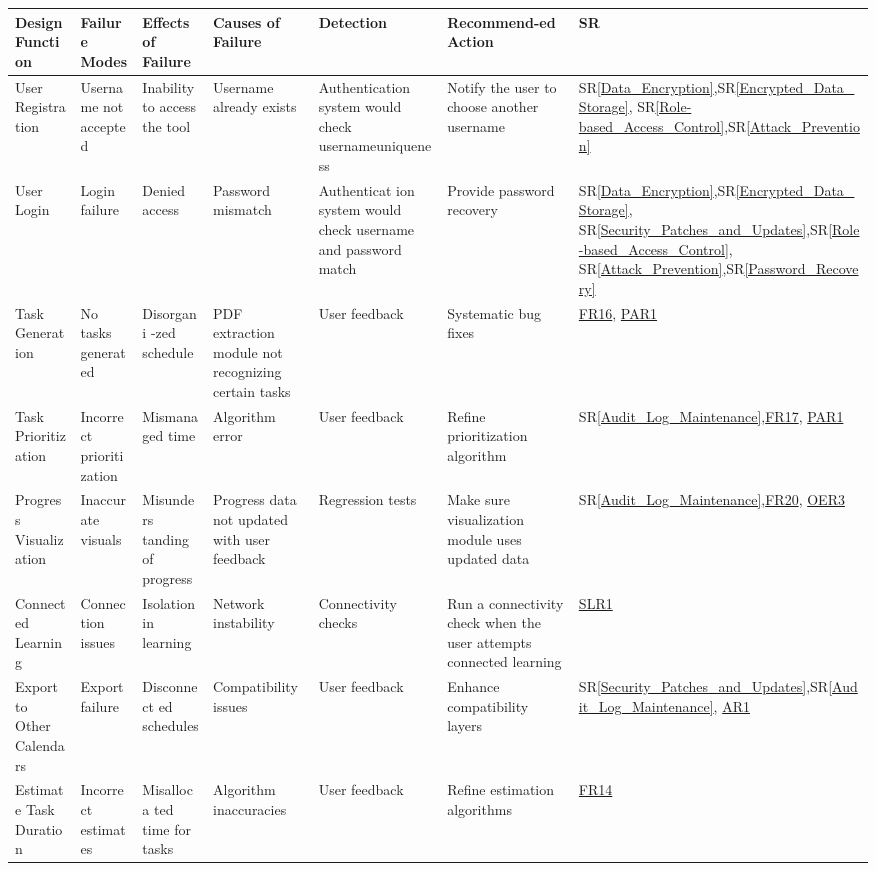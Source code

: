 \documentclass{article}
\newcommand{\srref}[1]{SR\ref{#1}}
\begin{document}
\begin{longtable}{|p{1.5cm}|p{1.5cm}|p{1.5cm}|p{2cm}|p{2cm}|p{2cm}|p{1.5cm}|}
  \hline
  \textbf{Design Function} & \textbf{Failure Modes} & \textbf{Effects of Failure} & \textbf{Causes of Failure} & \textbf{Detection} & \textbf{Recommend\newline -ed Action} & \textbf{SR} \\
  \hline
  User Registration & Username not accepted & Inability to access the tool & Username already exists & Authenticati\-on system would check username\newline uniqueness & Notify the user to choose another username & \srref{Data_Encryption},\srref{Encrypted_Data_Storage}, \srref{Role-based_Access_Control},\srref{Attack_Prevention} \\
  \hline
  User Login & Login failure & Denied access & Password mismatch & Authenticat \-ion system would check username and password match & Provide password recovery & \srref{Data_Encryption},\srref{Encrypted_Data_Storage}, \srref{Security_Patches_and_Updates},\srref{Role-based_Access_Control}, \srref{Attack_Prevention},\srref{Password_Recovery} \\
  \hline
  Task Generation & No tasks generated & Disorgani -zed schedule & PDF extraction module not recognizing certain tasks & User feedback & Systematic bug fixes & \href{../SRS/SRS.pdf#page=28}{FR16}, \href{../SRS/SRS.pdf#page=34}{PAR1} \\
  \hline
  Task Prioritization & Incorrect prioritization & Mismana \-ged time & Algorithm error & User feedback & Refine prioritization algorithm & \srref{Audit_Log_Maintenance},\href{../SRS/SRS.pdf#page=28}{FR17}, \href{../SRS/SRS.pdf#page=34}{PAR1} \\
  \hline
  Progress Visualization & Inaccurate visuals & Misunders \-tanding of progress & Progress data not updated with user feedback & Regression tests & Make sure visualization module uses updated data & \srref{Audit_Log_Maintenance},\href{../SRS/SRS.pdf#page=28}{FR20}, \href{../SRS/SRS.pdf#page=36}{OER3}\\
  \hline
  Connected Learning & Connection issues & Isolation in learning & Network instability & Connectivity checks & Run a connectivity check when the user attempts connected learning & \href{../SRS/SRS.pdf#page=33}{SLR1} \\
  \hline
  Export to Other Calendars & Export failure & Disconnect \-ed schedules & Compatibility issues & User feedback & Enhance compatibility layers & \srref{Security_Patches_and_Updates},\srref{Audit_Log_Maintenance}, \href{../SRS/SRS.pdf#page=30}{AR1} \\
  \hline
  Estimate Task Duration & Incorrect estimates & Misalloca \-ted time for tasks & Algorithm inaccuracies & User feedback & Refine estimation algorithms & \href{../SRS/SRS.pdf#page=27}{FR14} \\
  \hline
  \end{longtable}
  
\end{document}
